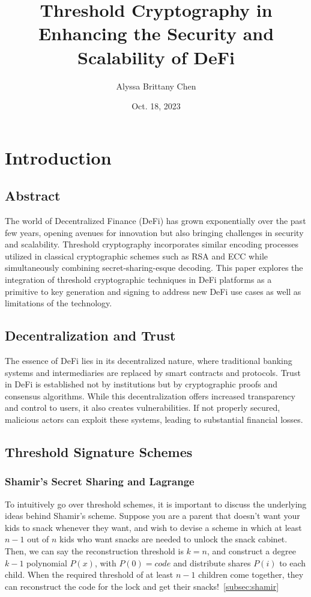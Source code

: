 \documentclass[12pt]{article}
\title{Threshold Cryptography in Enhancing the Security and Scalability of DeFi}
\author{Alyssa Brittany Chen}
\date{Oct. 18, 2023}
\begin{document}
\maketitle


\tableofcontents

\newpage

\section{Introduction}


\subsection{Abstract}
The world of Decentralized Finance (DeFi) has grown exponentially over the past few years, opening avenues for innovation but also bringing challenges in security and scalability. Threshold cryptography incorporates similar encoding processes utilized in classical cryptographic schemes such as RSA and ECC while simultaneously combining secret-sharing-esque decoding. This paper explores the integration of threshold cryptographic techniques in DeFi platforms as a primitive to key generation and signing to address new DeFi use cases as well as limitations of the technology.

\subsection{Decentralization and Trust}
The essence of DeFi lies in its decentralized nature, where traditional banking systems and intermediaries are replaced by smart contracts and protocols. Trust in DeFi is established not by institutions but by cryptographic proofs and consensus algorithms. While this decentralization offers increased transparency and control to users, it also creates vulnerabilities. If not properly secured, malicious actors can exploit these systems, leading to substantial financial losses.


\subsection{Threshold Signature Schemes}
\subsubsection{Shamir's Secret Sharing and Lagrange}
To intuitively go over threshold schemes, it is important to discuss the underlying ideas behind Shamir's scheme. Suppose you are a parent that doesn't want your kids to snack whenever they want, and wish to devise a scheme in which at least \(n-1\) out of \(n\) kids who want snacks are needed to unlock the snack cabinet. Then, we can say the reconstruction threshold is \(k=n\), and construct a degree \(k-1\) polynomial \(P(x)\), with \(P(0)=code\) and distribute shares \(P(i)\) to each child. When the required threshold of at least \(n-1\) children come together, they can reconstruct the code for the lock and get their snacks!~\ref{subsec:shamir}
\end{document}

